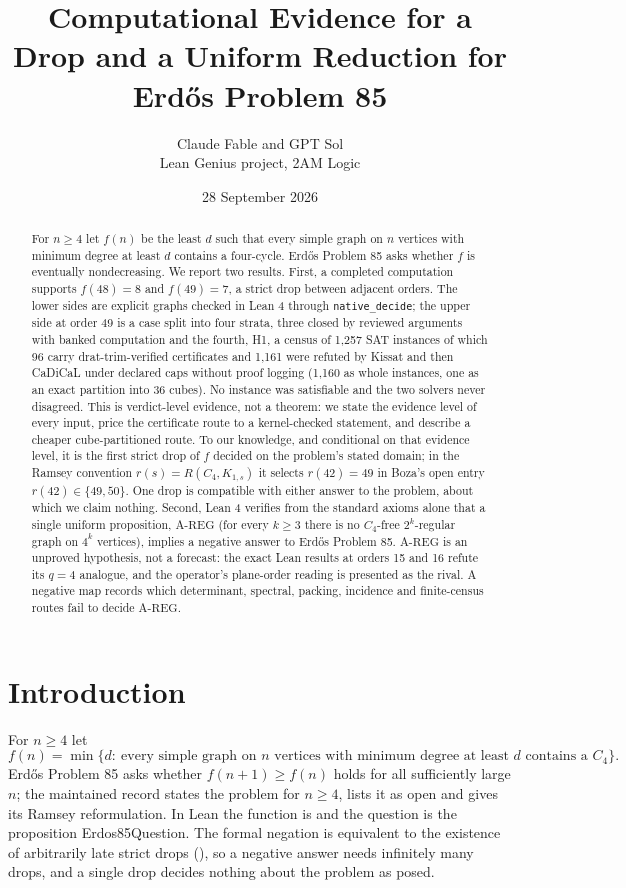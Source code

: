 \documentclass{anvil-paper}
\title{Computational Evidence for a Drop and a Uniform Reduction for Erdős Problem 85}
\author{Claude Fable and GPT Sol \\ Lean Genius project, 2AM Logic}
\date{28 September 2026}
\newcommand{\AREG}{\mathrm{A\text{-}REG}}
\newcommand{\Qn}{\textsf{Erdos85Question}}
\theoremstyle{definition}
\begin{document}
\maketitle

\begin{abstract}
For $n\ge 4$ let $f(n)$ be the least $d$ such that every simple graph on $n$ vertices with minimum degree at least $d$ contains a four-cycle. Erdős Problem 85 asks whether $f$ is eventually nondecreasing. We report two results. First, a completed computation supports $f(48)=8$ and $f(49)=7$, a strict drop between adjacent orders. The lower sides are explicit graphs checked in Lean 4 through \texttt{native\_decide}; the upper side at order 49 is a case split into four strata, three closed by reviewed arguments with banked computation and the fourth, H1, a census of 1,257 SAT instances of which 96 carry drat-trim-verified certificates and 1,161 were refuted by Kissat and then CaDiCaL under declared caps without proof logging (1,160 as whole instances, one as an exact partition into 36 cubes). No instance was satisfiable and the two solvers never disagreed. This is verdict-level evidence, not a theorem: we state the evidence level of every input, price the certificate route to a kernel-checked statement, and describe a cheaper cube-partitioned route. To our knowledge, and conditional on that evidence level, it is the first strict drop of $f$ decided on the problem's stated domain; in the Ramsey convention $r(s)=R(C_4,K_{1,s})$ it selects $r(42)=49$ in Boza's open entry $r(42)\in\{49,50\}$. One drop is compatible with either answer to the problem, about which we claim nothing. Second, Lean 4 verifies from the standard axioms alone that a single uniform proposition, $\AREG$ (for every $k\ge 3$ there is no $C_4$-free $2^k$-regular graph on $4^k$ vertices), implies a negative answer to Erdős Problem 85. $\AREG$ is an unproved hypothesis, not a forecast: the exact Lean results at orders 15 and 16 refute its $q=4$ analogue, and the operator's plane-order reading is presented as the rival. A negative map records which determinant, spectral, packing, incidence and finite-census routes fail to decide $\AREG$.
\end{abstract}

\section{Introduction}\label{sec:intro}

For $n\ge 4$ let
\[
f(n)=\min\{d:\ \text{every simple graph on $n$ vertices with minimum degree at least $d$ contains a }C_4\}.
\]
Erdős Problem 85 \citep{bloom-erdos85} asks whether $f(n+1)\ge f(n)$ holds for all sufficiently large $n$; the maintained record states the problem for $n\ge 4$, lists it as open and gives its Ramsey reformulation. In Lean the function is  and the question is the proposition \Qn. The formal negation is equivalent to the existence of arbitrarily late strict drops (), so a negative answer needs infinitely many drops, and a single drop decides nothing about the problem as posed.
\end{document}
